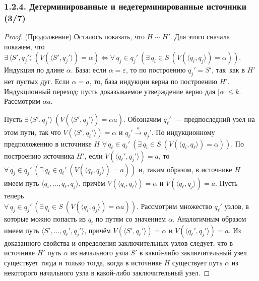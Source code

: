\documentclass[mathserif,12pt,aspectratio=169]{beamer}
\let\Equiv\Longleftrightarrow
\def\A#1#2{\forall\,#1\ \left(#2\right)}
\def\E#1#2{\exists\,#1\ \left(#2\right)}
\let\leq\leqslant
\begin{document}
\begin{frame}
\frametitle{1.2.4. Детерминированные и недетерминированные источники (3/7)}
\begin{proof} (Продолжение)
Осталось показать, что $H\sim H'$. Для этого сначала покажем, что
$
\E{\langle S', q_j'\rangle}
{V(\langle S', q_j'\rangle) = \alpha}
\Equiv
\A{q_j\in q_j'}
{\E{q_i\in S}
{V(\langle q_i, q_j \rangle)=\alpha}}.
$
Индукция по длине $\alpha$. База: если
$\alpha=\varepsilon$, то по построению $q_j' = S'$, так~как в $H'$
нет пустых дуг. Если $\alpha=a$,
то, база индукции верна по построению $H'$.
Индукционный переход: пусть
доказываемое утверждение верно для $|\alpha|\leq k$. Рассмотрим
$\alpha a$.

Пусть $\E{\langle S', q_j'\rangle}
{V(\langle S', q_j'\rangle)= \alpha a}$.
Обозначим
$q_\ell'$~--- предпоследний узел на этом пути, так что
$V(\langle S', q_\ell'\rangle)= \alpha$ и
$q_\ell'\stackrel{a}\longrightarrow q_j'$.
По индукционному предположению в источнике $H$
$\A{q_\ell\in q_\ell'}{\E{q_i\in S}{V(\langle q_i, q_\ell \rangle)=\alpha}}$.
По построению источника $H'$, если
$V(\langle q_\ell', q_j'\rangle) =a$, то
$\A{q_j\in q_j'}{\E{q_\ell\in q_\ell'}{V(\langle q_\ell, q_j\rangle)=a}}$ и, таким
образом, в источнике $H$ имеем путь $\langle q_i,\dots, q_\ell,
q_j\rangle$, причём $V(\langle q_i, q_\ell\rangle)=\alpha$ и
$V(\langle q_\ell, q_j\rangle)=a$.
Пусть теперь \\$\A{q_j\in q_j'}
{\E{q_i\in S}
{V(\langle q_i, q_j \rangle)=\alpha a}}$. Рассмотрим
множество $q_\ell'$ узлов, в которые можно попасть из $q_i$ по путям
со значением $\alpha$. Аналогичным образом имеем путь
$\langle S',\dots, q_\ell', q_j'\rangle$, причём
$V(\langle S',q_\ell'\rangle)=\alpha$ и $V(\langle q_\ell', q_j'\rangle)=a$.
Из доказанного свойства и определения заключительных узлов следует, что в источнике $H'$ путь $\alpha$  из начального узла $S'$ в какой-либо
заключительный узел существует тогда и только тогда, когда в источнике $H$ существует
путь $\alpha$ из некоторого начального узла в какой-либо
заключительный узел.
\end{proof}
\end{frame}
\end{document}
